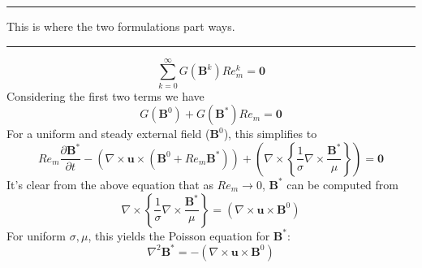 \documentclass[11pt]{article}
\newcommand{\B}{\mathbf{B}}
\newcommand{\PD}{\partial}
\newcommand{\U}{\mathbf{u}}
\begin{document}
\noindent
\rule{\textwidth}{1pt}
\begin{center}
This is where the two formulations part ways.
\end{center}
\noindent
\rule{\textwidth}{1pt}
\begin{equation}
	\sum_{k=0}^{\infty} G(\B^k)
  Re_m^k
	=
	\mathbf{0}
\end{equation}
Considering the first two terms we have
\begin{equation}
  G(\B^0)
  +
  G(\B^{*}) Re_m
  =
  \mathbf{0}
\end{equation}
For a uniform and steady external field ($\B^0$), this simplifies to
\begin{equation}
  Re_m \frac{\PD \B^{*}}{\PD t} 
  -
  (\nabla \times \U \times (\B^0 + Re_m \B^*))
  +
  \left(
  \nabla \times
  \left\{
  \frac{1}{\sigma}
  \nabla \times
  \frac{\B^{*}}{\mu}
  \right\}
  \right)
  =
  \mathbf{0}
\end{equation}
It's clear from the above equation that as $Re_m \rightarrow 0$, $\B^*$ can be computed from
\begin{equation}
  \nabla \times
  \left\{
  \frac{1}{\sigma}
  \nabla \times
  \frac{\B^{*}}{\mu}
  \right\}
  =
  (\nabla \times \U \times \B^0)
\end{equation}
For uniform $\sigma, \mu$, this yields the Poisson equation for $\B^*$:
\begin{equation}
  \nabla^2 \B^{*}
  =
  -
  (\nabla \times \U \times \B^0)
\end{equation}
\end{document}
